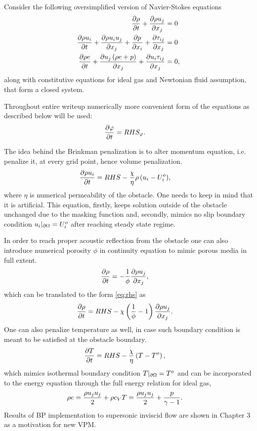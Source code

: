 Consider the following oversimplified version of Navier-Stokes equations
\begin{align}
\nonumber
\frac {\partial \rho}{\partial t} + \frac {\partial \rho u_j}{\partial x_j} &= 0 \\
\frac {\partial \rho u_i}{\partial t} + \frac {\partial \rho u_i u_j}{\partial x_j} + \frac {\partial p}{\partial x_i} + \frac {\partial \tau_{ij}}{\partial x_j} &= 0\\
\nonumber
\frac {\partial \rho e}{\partial t} + \frac {\partial u_j \left(\rho e + p\right)}{\partial x_j} + \frac {\partial u_i \tau_{ij}}{\partial x_j} &= 0,
\end{align}
along with constitutive equations for ideal gas and Newtonian fluid assumption, that form a closed system.

Throughout entire writeup numerically more convenient form of the equations as described below will be used:
\begin{align}
\frac {\partial \varphi}{\partial t} &= RHS_\varphi. \label{eq:rhs}
\end{align}

The idea behind the Brinkman penalization is to alter momentum equation, i.e. penalize it, at every grid point, hence volume penalization. 
\begin{align}
\frac {\partial \rho u_i}{\partial t} &= RHS - \frac \chi \eta {\rho \left(u_i - U_i^o\right)},
\end{align}
where $\eta$ is numerical permeability of the obstacle. One needs to keep in mind that it is artificial. This equation, firstly, keeps solution outside of the obstacle unchanged due to the masking function and, secondly, mimics no slip boundary condition $u_i|_{\partial \Omega} = U_i^o$ after reaching steady state regime. 

In order to reach proper acoustic reflection from the obstacle one can also introduce numerical porosity $\phi$ in continuity equation to mimic porous media in full extent.
\begin{align}
\nonumber
\frac {\partial \rho}{\partial t} &= -\frac 1\phi \frac {\partial \rho u_j}{\partial x_j},
\end{align}
which can be translated to the form \eqref{eq:rhs} as 
\begin{align}
\frac {\partial \rho}{\partial t} &= RHS - \chi \left(\frac 1\phi - 1\right) \frac {\partial \rho u_j}{\partial x_j}. \label{eq:poro_den}
\end{align}
One can also penalize temperature as well, in case such boundary condition is meant to be satisfied at the obstacle boundary.
\begin{align}
\frac {\partial T}{\partial t} &= RHS - \frac \chi \eta \left(T - T^o\right),
\end{align}
which mimics isothermal boundary condition $T|_{\partial \Omega} = T^o$ and can be incorporated to the energy equation through the full energy relation for ideal gas,
\begin{align}
\rho e &= \frac {\rho u_j u_j}2 + \rho c_VT = \frac {\rho u_j u_j}2 + \frac p{\gamma - 1} \label{eq:igeos}.
\end{align}
Results of BP implementation to supersonic inviscid flow are shown in Chapter 3 as a motivation for new VPM.


